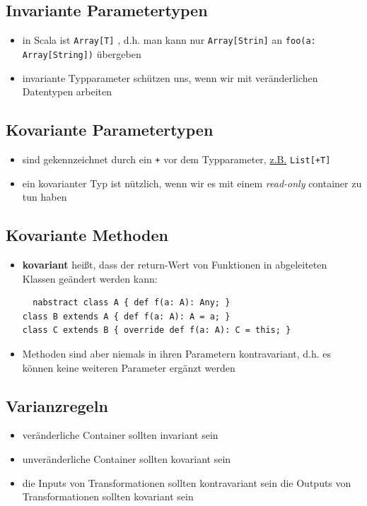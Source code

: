 \subsection{Invariante Parametertypen}
\begin{itemize}
  \item in Scala ist \texttt{Array[T]} , d.h. 
  man kann nur \texttt{Array[Strin]} an \texttt{foo(a: Array[String])}
  übergeben
  \item invariante Typparameter schützen uns, wenn wir mit veränderlichen
  Datentypen arbeiten
\end{itemize}


\subsection{Kovariante Parametertypen}
\begin{itemize}
  \item sind gekennzeichnet durch ein \texttt{+} vor dem Typparameter,
  \uline{z.B.} \texttt{List[+T]}
  \item ein kovarianter Typ ist nützlich, wenn wir es mit einem
  \textit{read-only} container zu tun haben
  
  
\end{itemize}


\subsection{Kovariante Methoden}
\begin{itemize}
  \item \textbf{kovariant} heißt, dass der return-Wert von Funktionen in
  abgeleiteten Klassen geändert werden kann:
  
  \begin{verbatim}
  nabstract class A { def f(a: A): Any; }
class B extends A { def f(a: A): A = a; }
class C extends B { override def f(a: A): C = this; }
  \end{verbatim}
  \item Methoden sind aber niemals in ihren Parametern kontravariant, d.h. es
  können keine weiteren Parameter ergänzt werden
\end{itemize}


\subsection{Varianzregeln}
\begin{itemize}
  \item veränderliche Container sollten invariant sein
  \item unveränderliche Container sollten kovariant sein
  \item die Inputs von Transformationen sollten kontravariant sein
  \und die Outputs von Transformationen sollten kovariant sein
\end{itemize}
\pagebreak


